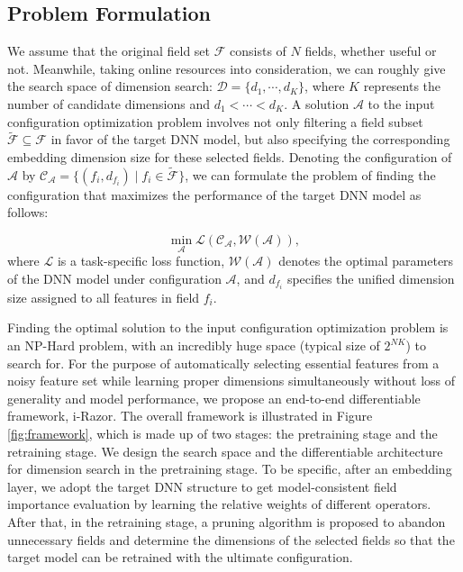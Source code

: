 \documentclass[10pt,journal,compsoc]{IEEEtran}
\begin{document}
\subsection{Problem Formulation}
We assume that the original field set $\mathcal{F}$ consists of $N$ fields, whether useful or not.
Meanwhile, taking online resources into consideration, we can roughly give the search space of dimension search: $\mathcal{D}=\{d_1, \cdots, d_K\}$, where $K$ represents the number of candidate dimensions and $d_1< \cdots<d_K$. 
A solution $\mathcal{A}$ to the input configuration optimization problem involves not only filtering a field subset $\widetilde{\mathcal{F}} \subseteq \mathcal{F}$ in favor of the target DNN model, but also specifying the corresponding embedding dimension size for these selected fields.
Denoting the configuration of $\mathcal{A}$ by $\mathcal{C}_\mathcal{A} = \{(f_i, {d}_{f_i}) \mid f_i \in  \widetilde{\mathcal{F}}\}$, we can formulate the problem of finding the configuration that maximizes the performance of the target DNN model as follows:

\begin{equation}
\label{def_pro}
    \mathop{min}\limits_{\mathcal{A}} \mathcal{L}\left(\mathcal{C}_\mathcal{A}, \mathcal{W}\left(\mathcal{A}\right)\right),
\end{equation} 
where $\mathcal{L}$ is a task-specific loss function, $\mathcal{W}(\mathcal{A})$ denotes the optimal parameters of the DNN model under configuration $\mathcal{A}$, and ${d}_{f_i}$ specifies the unified dimension size assigned to all features in field $f_i$.

Finding the optimal solution to the input configuration optimization problem is an NP-Hard problem, with an incredibly huge space (typical size of $2^{NK}$) to search for.
For the purpose of automatically selecting essential features from a noisy feature set while learning proper dimensions simultaneously without loss of generality and model performance, we propose an end-to-end differentiable framework, i-Razor. The overall framework is illustrated in Figure \ref{fig:framework}, which is made up of two stages:
the {pretraining stage} and the {retraining stage}. 
We design the search space and the differentiable architecture for dimension search in the {pretraining stage}. To be specific, after an embedding layer, we adopt the target DNN structure to get model-consistent field importance evaluation by learning the relative weights of different operators. After that, in the {retraining stage}, a pruning algorithm is proposed to abandon unnecessary fields and determine the dimensions of the selected fields so that the target model can be retrained with the ultimate configuration. 
\end{document}
